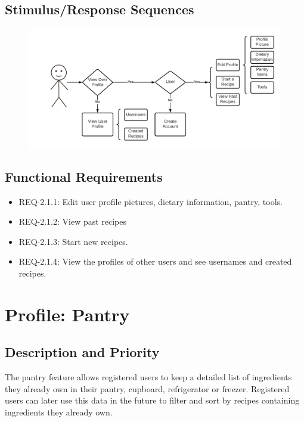 \documentclass{scrreprt}
\begin{document}
\subsection{Stimulus/Response Sequences}

\begin{figure}[H]\centering
    \includegraphics[width=\columnwidth]{FlowCharts/Profile-Profile.png}
\end{figure}

\subsection{\gls{Functional Requirements}}

\begin{itemize}
    \item REQ-2.1.1: Edit user profile pictures, dietary information, pantry, tools.
    \item REQ-2.1.2: View past recipes
    \item REQ-2.1.3: Start new recipes.
    \item REQ-2.1.4: View the profiles of other users and see usernames and created recipes.
\end{itemize}

\section{Profile: Pantry}

\subsection{Description and Priority}

The pantry feature allows registered users to keep a detailed list of ingredients they already own in their pantry, cupboard, refrigerator or freezer. Registered users can later use this data in the future to filter and sort by recipes containing ingredients they already own.
\end{document}
